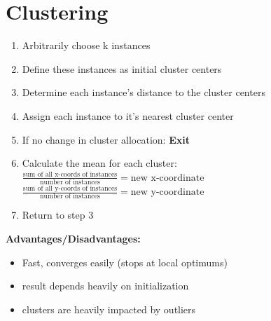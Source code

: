 \section{Clustering}

\begin{breakbox}

\begin{enumerate}
	\item Arbitrarily choose k instances
	\item Define these instances as initial cluster centers
	\item Determine each instance's distance to the cluster centers
	\item Assign each instance to it's nearest cluster center
	\item If no change in cluster allocation: \textbf{Exit}
	\item Calculate the mean for each cluster:
	$\frac{\text{sum of all x-coords of instances}}{\text{number of instances}} = \text{new x-coordinate}$
	$\frac{\text{sum of all y-coords of instances}}{\text{number of instances}} = \text{new y-coordinate}$
	\item Return to step 3
\end{enumerate}

\textbf{Advantages/Disadvantages:}
\begin{itemize}
	\item Fast, converges easily (stops at local optimums)
	\item result depends heavily on initialization
	\item clusters are heavily impacted by outliers
\end{itemize}
\end{breakbox}

